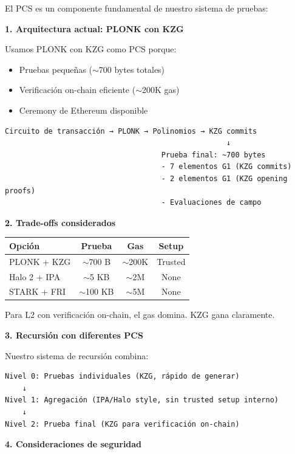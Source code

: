 \documentclass[11pt,a4paper,twoside,openright]{book}
\theoremstyle{definition}
\theoremstyle{plain}
\theoremstyle{remark}
\begin{document}
\begin{bancozk}
El PCS es un componente fundamental de nuestro sistema de pruebas:

\textbf{1. Arquitectura actual: PLONK con KZG}

Usamos PLONK con KZG como PCS porque:
\begin{itemize}
    \item Pruebas pequeñas ($\sim$700 bytes totales)
    \item Verificación on-chain eficiente ($\sim$200K gas)
    \item Ceremony de Ethereum disponible
\end{itemize}

\begin{verbatim}
Circuito de transacción → PLONK → Polinomios → KZG commits
                                                   ↓
                                    Prueba final: ~700 bytes
                                    - 7 elementos G1 (KZG commits)
                                    - 2 elementos G1 (KZG opening proofs)
                                    - Evaluaciones de campo
\end{verbatim}

\textbf{2. Trade-offs considerados}

\begin{center}
\begin{tabular}{lccc}
\toprule
\textbf{Opción} & \textbf{Prueba} & \textbf{Gas} & \textbf{Setup} \\
\midrule
PLONK + KZG & $\sim$700 B & $\sim$200K & Trusted \\
Halo 2 + IPA & $\sim$5 KB & $\sim$2M & None \\
STARK + FRI & $\sim$100 KB & $\sim$5M & None \\
\bottomrule
\end{tabular}
\end{center}

Para L2 con verificación on-chain, el gas domina. KZG gana claramente.

\textbf{3. Recursión con diferentes PCS}

Nuestro sistema de recursión combina:
\begin{verbatim}
Nivel 0: Pruebas individuales (KZG, rápido de generar)
    ↓
Nivel 1: Agregación (IPA/Halo style, sin trusted setup interno)
    ↓
Nivel 2: Prueba final (KZG para verificación on-chain)
\end{verbatim}

\textbf{4. Consideraciones de seguridad}


\end{bancozk}
\end{document}
